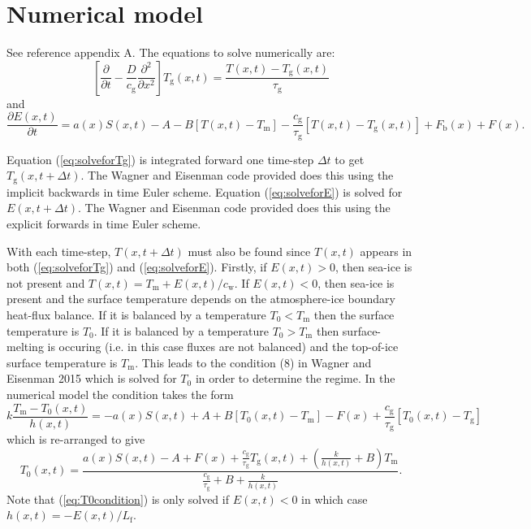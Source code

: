 \documentclass[12pt]{article}
\begin{document}
\section{Numerical model}
See reference appendix A. The equations to solve numerically are:
\begin{equation}\label{eq:solveforTg}
\left[\frac{\partial}{\partial t} - \frac{D}{c_\mathrm{g}}\frac{\partial^2}{\partial x^2}\right]T_\mathrm{g}(x,t) = \frac{T(x,t) - T_\mathrm{g}(x,t)}{\tau_\mathrm{g}}
\end{equation}
and
\begin{equation}\label{eq:solveforE}
\frac{\partial E(x,t)}{\partial t} = a(x)S(x,t) - A - B\left[T(x,t)-T_\mathrm{m}\right] - \frac{c_\mathrm{g}}{\tau_\mathrm{g}}\left[T(x,t)-T_\mathrm{g}(x,t)\right] + F_\mathrm{b}(x) + F(x).
\end{equation}

Equation (\ref{eq:solveforTg}) is integrated forward one time-step $\Delta t$ to get $T_\mathrm{g}(x,t+\Delta t)$. The Wagner and Eisenman code provided does this using the implicit backwards in time Euler scheme. Equation (\ref{eq:solveforE}) is solved for $E(x,t+\Delta t)$. The Wagner and Eisenman code provided does this using the explicit forwards in time Euler scheme.

With each time-step, $T(x,t+\Delta t)$ must also be found since $T(x,t)$ appears in both (\ref{eq:solveforTg}) and (\ref{eq:solveforE}). Firstly, if $E(x,t)>0$, then sea-ice is not present and $T(x,t)=T_\mathrm{m}+E(x,t)/c_\mathrm{w}$. If $E(x,t)<0$, then sea-ice is present and the surface temperature depends on the atmosphere-ice boundary heat-flux balance. If it is balanced by a temperature $T_0<T_\mathrm{m}$ then the surface temperature is $T_0$. If it is balanced by a temperature $T_0>T_\mathrm{m}$ then surface-melting is occuring (i.e. in this case fluxes are not balanced) and the top-of-ice surface temperature is $T_\mathrm{m}$. This leads to the condition (8) in Wagner and Eisenman 2015 which is solved for $T_0$ in order to determine the regime. In the numerical model the condition takes the form
\begin{equation}\label{eq:fluxbalancereexpressed}
k\frac{T_\mathrm{m}-T_0(x,t)}{h(x,t)}=-a(x)S(x,t) + A + B\left[T_0(x,t)-T_\mathrm{m}\right] - F(x) + \frac{c_\mathrm{g}}{\tau_\mathrm{g}}\left[T_0(x,t)-T_\mathrm{g}\right]
\end{equation}
which is re-arranged to give
\begin{equation}\label{eq:T0condition}
T_0(x,t) = \frac{a(x)S(x,t)-A+F(x)+\frac{c_\mathrm{g}}{\tau_\mathrm{g}}T_\mathrm{g}(x,t)+\left(\frac{k}{h(x,t)}+B\right)T_\mathrm{m}}{\frac{c_\mathrm{g}}{\tau_\mathrm{g}}+B+\frac{k}{h(x,t)}}.
\end{equation}
Note that (\ref{eq:T0condition}) is only solved if $E(x,t)<0$ in which case $h(x,t)=-E(x,t)/L_\mathrm{f}$.
\end{document}
